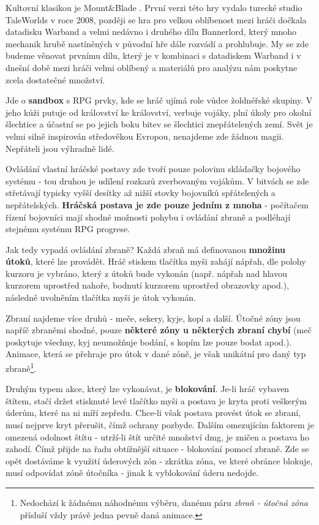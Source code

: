 Kultovní klasikou je Mount\&Blade \cite{MountAndBlade}. První verzi této hry vydalo turecké studio TaleWorlds v roce 2008, později se hra pro velkou oblíbenost mezi hráči dočkala datadisku Warband a velmi nedávno i druhého dílu Bannerlord, který mnoho mechanik hrubě nastíněných v původní hře dále rozvádí a prohlubuje. My se zde budeme věnovat prvnímu dílu, který je v kombinaci s datadiskem Warband i v dnešní době mezi hráči velmi oblíbený a materiálů pro analýzu nám poskytne zcela dostatečné množství.

Jde o \textbf{sandbox} s \acs{RPG} prvky, kde se hráč ujímá role vůdce žoldnéřské skupiny. V jeho kůži putuje od království ke království, verbuje vojáky, plní úkoly pro okolní šlechtice a účastní se po jejich boku bitev se šlechtici znepřátelených zemí. Svět je velmi silně inspirován středověkou Evropou, nenajdeme zde žádnou magii. Nepřáteli jsou výhradně lidé. 

Ovládání vlastní hráčské postavy zde tvoří pouze polovinu skládačky bojového systému - tou druhou je udílení rozkazů zverbovaným vojákům. V bitvách se zde střetávají typicky vyšší desítky až nižší stovky bojovníků spřátelených a nepřátelských. \textbf{Hráčská postava je zde pouze jedním z mnoha} - počítačem řízení bojovníci mají shodné možnosti pohybu i ovládání zbraně a podléhají stejnému systému \acs{RPG} progrese. 

Jak tedy vypadá ovládání zbraně? Každá zbraň má definovanou \textbf{množinu útoků}, které lze provádět. Hráč stiskem tlačítka myši zahájí nápřah, dle polohy kurzoru je vybráno, který z útoků bude vykonán (např. nápřah nad hlavou kurzorem uprostřed nahoře, bodnutí kurzorem uprostřed obrazovky apod.), následně uvolněním tlačítka myši je útok vykonán.

Zbraní najdeme více druhů - meče, sekery, kyje, kopí a další. Útočné zóny jsou napříč zbraněmi shodné, pouze \textbf{některé zóny u některých zbraní chybí} (meč poskytuje všechny, kyj neumožňuje bodání, s kopím lze pouze bodat apod.). Animace, která se přehraje pro útok v dané zóně, je však unikátní pro daný typ zbraně\footnote{Nedochází k žádnému náhodnému výběru, danému páru \textit{zbraň - útočná zóna} přísluší vždy právě jedna pevně daná animace.}.

Druhým typem akce, který lze vykonávat, je \textbf{blokování}. Je-li hráč vybaven štítem, stačí držet stisknuté levé tlačítko myši a postava je kryta proti veškerým úderům, které na ni míří zepředu. Chce-li však postava provést útok se zbraní, musí nejprve kryt přerušit, čímž ochrany pozbyde. Dalším omezujícím faktorem je omezená odolnost štítu - utrží-li štít určité množství \acs{dmg}, je zničen a postava ho zahodí. Čímž přijde na řadu obtížnější situace - blokování pomocí zbraně. Zde se opět dostáváme k využití úderových zón - zkrátka zóna, ve které obránce blokuje, musí odpovídat zóně útočníka - jinak k vyblokování úderu nedojde.

